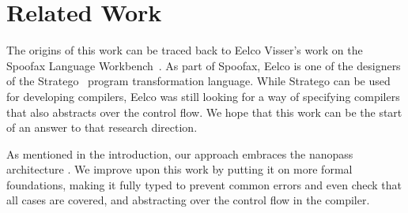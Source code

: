 \documentclass[a4paper,UKenglish,cleveref, autoref, thm-restate, anonymous]{oasics-v2021}
\begin{document}
% 
% 

\section{Related Work}\label{sec:related}

The origins of this work can be traced back to Eelco Visser's work on the Spoofax Language Workbench~\cite{6898704}. 
As part of Spoofax, Eelco is one of the designers of the Stratego~\cite{10.1007/3-540-45127-7_27} program transformation language. 
While Stratego can be used for developing compilers, Eelco was still looking for a way of specifying compilers that also abstracts over the control flow.
We hope that this work can be the start of an answer to that research direction.

As mentioned in the introduction, our approach embraces the nanopass architecture \cite{10.1145/1016850.1016878, 10.1145/2544174.2500618}.
We improve upon this work by putting it on more formal foundations, making it fully typed to prevent common errors and even check that all cases are covered, and abstracting over the control flow in the compiler.
\end{document}
